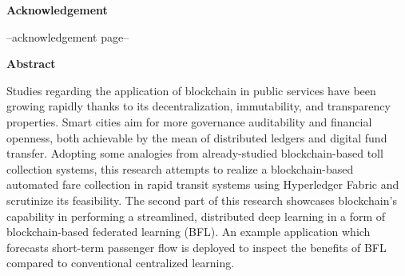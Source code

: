 \documentclass[a4paper,12pt,oneside, utf8x]{report}
\begin{document}
\linespread{1.6}\selectfont

\begin{titlepage}
\pagestyle{empty}
    \hfill \break \hfill \break
    {{\huge \centering \textbf{Acknowledgement}\par}
    \hfill \break \hfill \break
    --acknowledgement page--

    }
\end{titlepage}

\begin{titlepage}

\pagestyle{empty}
    \hfill \break \hfill \break
    {{\huge \centering \textbf{Abstract}\par}
    \hfill \break 
    Studies regarding the application of blockchain in public services have been growing rapidly thanks to its decentralization, immutability, and transparency properties. Smart cities aim for more governance auditability and financial openness, both achievable by the mean of distributed ledgers and digital fund transfer. Adopting some analogies from already-studied blockchain-based toll collection systems, this research attempts to realize a blockchain-based automated fare collection in rapid transit systems using Hyperledger Fabric and scrutinize its feasibility. The second part of this research showcases blockchain's capability in performing a streamlined, distributed deep learning in a form of blockchain-based federated learning (BFL). An example application which forecasts short-term passenger flow is deployed to inspect the benefits of BFL compared to conventional centralized learning.

    }
\end{titlepage}

\setlength{\cftbeforetoctitleskip}{-4em}
\setlength{\cftaftertoctitleskip}{-1.3em}
\setlength{\cftbeforeloftitleskip}{-4em}
\setlength{\cftafterloftitleskip}{-1.3em}
\setlength{\cftbeforelottitleskip}{-4em}
\setlength{\cftafterlottitleskip}{-1.3em}


\renewcommand{\contentsname}{\hfill Table of Contents \hfill}
\renewcommand{\cftaftertoctitle}{\hfill}
\tableofcontents
\newpage
\renewcommand{\listfigurename}{\hfill List of Figures \hfill}
\listoffigures
\newpage
\renewcommand{\listtablename}{\hfill List of Tables \hfill}
\listoftables
\end{document}

